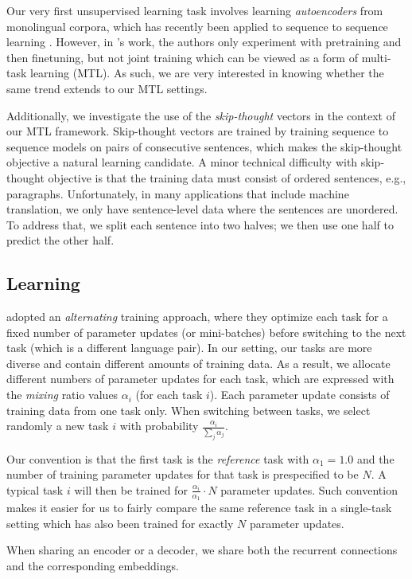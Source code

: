Our very first unsupervised learning task involves learning {\it autoencoders} from
monolingual corpora, which has recently been applied to sequence to sequence
learning \citep{dai15}. However, in \citet{dai15}'s work, the authors
only experiment with pretraining and then finetuning, but not joint training which
can be viewed as a form of multi-task learning (MTL). As such, we are
very interested in knowing whether the same trend extends to our MTL settings.

Additionally, we investigate the use of the {\it skip-thought}
vectors \citep{kiros15skip} in the context of our MTL framework.
Skip-thought vectors are trained by training sequence to sequence
models on pairs of consecutive sentences, which makes the skip-thought
objective a natural \ssl{} learning candidate. A minor technical
difficulty with skip-thought objective is that 
the training data must consist of ordered sentences, e.g., paragraphs.  Unfortunately, in
many applications that include machine translation, we only have
sentence-level data where the sentences are unordered. To
address that, we split each sentence into two halves; we then use 
one half to predict the other half.
\subsection{Learning}
\label{subsec:learning}
\cite{dong15} adopted an {\it alternating} training approach, where they
optimize each task for a fixed number of parameter updates (or
mini-batches) before switching to the next task (which is a different
language pair). In our setting, our tasks are more diverse and contain
different amounts of training data. As a result, we allocate different
numbers of parameter updates for each task, which are expressed with
the {\it mixing} ratio values $\alpha_i$ (for each task $i$). Each
parameter update consists of training data from one task only. When
switching between tasks, we select randomly a new task $i$ with
probability $\frac{\alpha_i}{\sum_j \alpha_j}$.


Our convention is that the first task is the
{\it reference} task with $\alpha_1 = 1.0$ and the number of training
parameter updates for that task is prespecified to be $N$. A typical task $i$ will then be
trained for $\frac{\alpha_i}{\alpha_1}\cdot N$ parameter updates.
Such convention makes it easier for us to fairly compare the same reference
task in a single-task setting which has also been trained for exactly $N$
parameter updates.

When sharing an encoder or a decoder, we share both the recurrent connections
and the corresponding embeddings.



